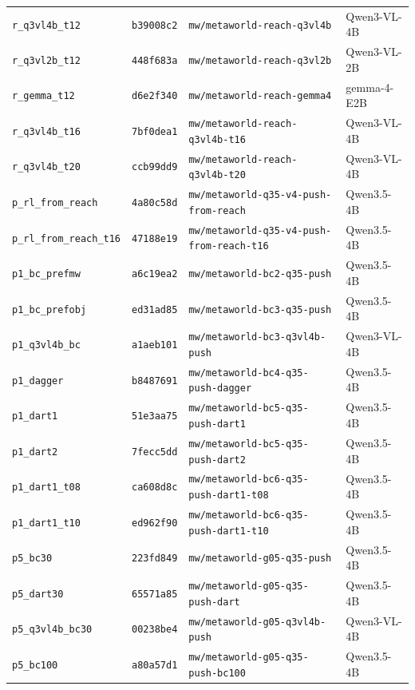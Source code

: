 \begin{longtable}{@{}llll@{}}
\texttt{r\_q3vl4b\_t12} & \texttt{b39008c2} & \texttt{mw/metaworld-reach-q3vl4b} & Qwen3-VL-4B \\
\texttt{r\_q3vl2b\_t12} & \texttt{448f683a} & \texttt{mw/metaworld-reach-q3vl2b} & Qwen3-VL-2B \\
\texttt{r\_gemma\_t12} & \texttt{d6e2f340} & \texttt{mw/metaworld-reach-gemma4} & gemma-4-E2B \\
\texttt{r\_q3vl4b\_t16} & \texttt{7bf0dea1} & \texttt{mw/metaworld-reach-q3vl4b-t16} & Qwen3-VL-4B \\
\texttt{r\_q3vl4b\_t20} & \texttt{ccb99dd9} & \texttt{mw/metaworld-reach-q3vl4b-t20} & Qwen3-VL-4B \\
\texttt{p\_rl\_from\_reach} & \texttt{4a80c58d} & \texttt{mw/metaworld-q35-v4-push-from-reach} & Qwen3.5-4B \\
\texttt{p\_rl\_from\_reach\_t16} & \texttt{47188e19} & \texttt{mw/metaworld-q35-v4-push-from-reach-t16} & Qwen3.5-4B \\
\texttt{p1\_bc\_prefmw} & \texttt{a6c19ea2} & \texttt{mw/metaworld-bc2-q35-push} & Qwen3.5-4B \\
\texttt{p1\_bc\_prefobj} & \texttt{ed31ad85} & \texttt{mw/metaworld-bc3-q35-push} & Qwen3.5-4B \\
\texttt{p1\_q3vl4b\_bc} & \texttt{a1aeb101} & \texttt{mw/metaworld-bc3-q3vl4b-push} & Qwen3-VL-4B \\
\texttt{p1\_dagger} & \texttt{b8487691} & \texttt{mw/metaworld-bc4-q35-push-dagger} & Qwen3.5-4B \\
\texttt{p1\_dart1} & \texttt{51e3aa75} & \texttt{mw/metaworld-bc5-q35-push-dart1} & Qwen3.5-4B \\
\texttt{p1\_dart2} & \texttt{7fecc5dd} & \texttt{mw/metaworld-bc5-q35-push-dart2} & Qwen3.5-4B \\
\texttt{p1\_dart1\_t08} & \texttt{ca608d8c} & \texttt{mw/metaworld-bc6-q35-push-dart1-t08} & Qwen3.5-4B \\
\texttt{p1\_dart1\_t10} & \texttt{ed962f90} & \texttt{mw/metaworld-bc6-q35-push-dart1-t10} & Qwen3.5-4B \\
\texttt{p5\_bc30} & \texttt{223fd849} & \texttt{mw/metaworld-g05-q35-push} & Qwen3.5-4B \\
\texttt{p5\_dart30} & \texttt{65571a85} & \texttt{mw/metaworld-g05-q35-push-dart} & Qwen3.5-4B \\
\texttt{p5\_q3vl4b\_bc30} & \texttt{00238be4} & \texttt{mw/metaworld-g05-q3vl4b-push} & Qwen3-VL-4B \\
\texttt{p5\_bc100} & \texttt{a80a57d1} & \texttt{mw/metaworld-g05-q35-push-bc100} & Qwen3.5-4B \\

\end{longtable}

